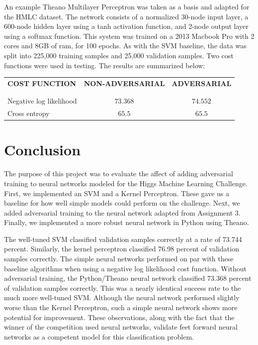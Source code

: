 \documentclass          {article} %
\begin{document}
An example Theano Multilayer Perceptron was taken as a basis and adapted for the HMLC dataset. The network consists of a normalized 30-node input layer, a 600-node hidden layer using a tanh activation function, and 2-node output layer using a softmax function. This system was trained on a 2013 Macbook Pro with 2 cores and 8GB of ram, for 100 epochs. As with the SVM baseline, the data was split into 225,000 training samples and 25,000 validation samples. Two cost functions were used in testing. The results are summarized below:

\begin{center}
\begin{tabular}{l c c}
{\bf COST FUNCTION} & {\bf NON-ADVERSARIAL} & {\bf ADVERSARIAL}\\
\\ \hline \\
Negative log likelihood & $73.368$ & $74.552$\\
Cross entropy           & $65.5$   & $65.5$\\
\end{tabular}
\end{center}


\section                {Conclusion}
\label                  {sec:conclusion}

The purpose of this project was to evaluate the affect of adding adversarial training to neural networks modeled for the Higgs Machine Learning Challenge. First, we implemented an SVM and a Kernel Perceptron. These gave us a baseline for how well simple models could perform on the challenge. Next, we added adversarial training to the neural network adapted from Assignment 3. Finally, we implemented a more robust neural network in Python using Theano.
 
The well-tuned SVM classified validation samples correctly at a rate of 73.744 percent. Similarly, the kernel perceptron classified 76.98 percent of validation samples correctly. The simple neural networks performed on par with these baseline algorithms when using a negative log likelihood cost function. Without adversarial training, the Python/Theano neural network classified 73.368 percent of validation samples correctly. This was a nearly identical success rate to the much more well-tuned SVM. Although the neural network performed slightly worse than the Kernel Perceptron, such a simple neural network shows more potential for improvement. These observations, along with the fact that the winner of the competition used neural networks, validate feet forward neural networks as a competent model for this classification problem.
\end{document}
